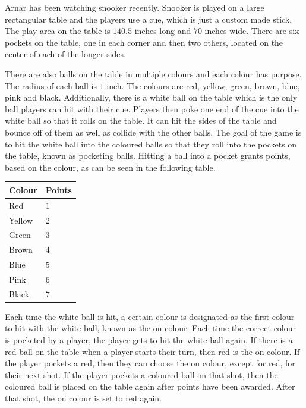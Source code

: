 
Arnar has been watching snooker recently.
Snooker is played on a large rectangular table and the players use a cue, which is just a custom made stick.
The play area on the table is $140.5$ inches long and $70$ inches wide.
There are six pockets on the table, one in each corner and then two others, located on the center of each of the longer sides.

There are also balls on the table in multiple colours and each colour has purpose.
The radius of each ball is $1$ inch.
The colours are red, yellow, green, brown, blue, pink and black.
Additionally, there is a white ball on the table which is the only ball players can hit with their cue.
Players then poke one end of the cue into the white ball so that it rolls on the table.
It can hit the sides of the table and bounce off of them as well as collide with the other balls.
The goal of the game is to hit the white ball into the coloured balls so that they roll into the pockets on the table, known as pocketing balls.
Hitting a ball into a pocket grants points, based on the colour, as can be seen in the following table.

\begin{center}
\begin{tabular}{|l|l|}
\hline
    Colour   & Points \\ \hline
    Red      & $1$  \\ \hline
    Yellow   & $2$  \\ \hline
    Green    & $3$  \\ \hline
    Brown    & $4$  \\ \hline
    Blue     & $5$  \\ \hline
    Pink     & $6$  \\ \hline
    Black    & $7$  \\ \hline
\end{tabular}
\end{center}

Each time the white ball is hit, a certain colour is designated as the first colour to hit with the white ball, known as the on colour.
Each time the correct colour is pocketed by a player, the player gets to hit the white ball again.
If there is a red ball on the table when a player starts their turn, then red is the on colour.
If the player pockets a red, then they can choose the on colour, except for red, for their next shot.
If the player pockets a coloured ball on that shot, then the coloured ball is placed on the table again after points have been awarded.
After that shot, the on colour is set to red again.

